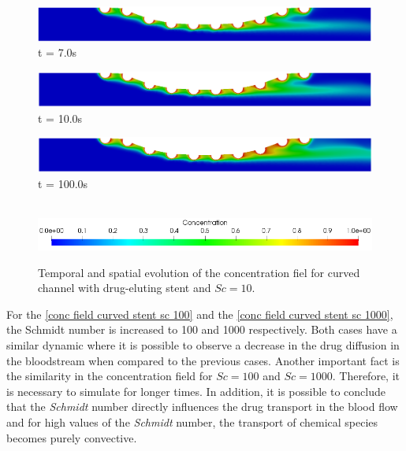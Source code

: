 \begin{figure}[H]
     \begin{minipage}{.50\linewidth}
      \centering
      \includegraphics[scale=0.18]{./02_chaps/cap_solution/figure/conc10_CurvedStrut6.png}\\
      t = 7.0s
     \end{minipage}
     \begin{minipage}{.50\linewidth}
     \medskip
      \centering
      \includegraphics[scale=0.18]{./02_chaps/cap_solution/figure/conc10_CurvedStrut7.png}\\
      t = 10.0s
     \end{minipage}%
     \begin{minipage}{.50\linewidth}
     \medskip
      \centering
      \includegraphics[scale=0.18]{./02_chaps/cap_solution/figure/conc10_CurvedStrut8.png}\\
      t = 100.0s
     \end{minipage}\\[10pt]
      \centering
      \includegraphics[scale=0.5]{./02_chaps/cap_solution/figure/conc1_CurvedStrutScale.png}\\
     \medskip
    \caption{
Temporal and spatial evolution of the concentration fiel for curved channel with drug-eluting stent and $Sc=10$.}
     \label{conc field curved stent sc 10}
\end{figure}


\medskip
For the \ref{conc field curved stent sc 100}
and the \ref{conc field curved stent sc 1000},
the Schmidt number is increased to 100 and 1000 respectively.
Both cases have a similar dynamic where it is possible
to observe a decrease in the drug diffusion in the bloodstream
when compared to the previous cases. Another important fact
is the similarity in the concentration field for $Sc=100$
and $Sc=1000$. Therefore, it is necessary to simulate
for longer times. In addition, it is possible to conclude 
that the \textit{Schmidt} number directly 
influences the drug transport in the blood flow and 
for high values of the \textit{Schmidt} number, 
the transport of chemical species becomes purely convective.



